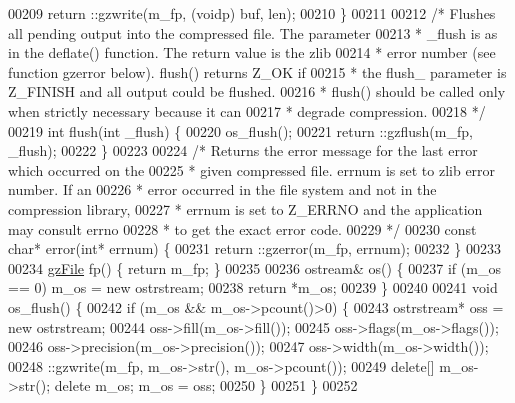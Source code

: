 \begin{DoxyCode}
00209             return ::gzwrite(m\_fp, (voidp) buf, len);
00210         \}
00211 
00212         \textcolor{comment}{/* Flushes all pending output into the compressed file. The parameter}
00213 \textcolor{comment}{         * \_flush is as in the deflate() function. The return value is the zlib}
00214 \textcolor{comment}{         * error number (see function gzerror below). flush() returns Z\_OK if}
00215 \textcolor{comment}{         * the flush\_ parameter is Z\_FINISH and all output could be flushed.}
00216 \textcolor{comment}{         * flush() should be called only when strictly necessary because it can}
00217 \textcolor{comment}{         * degrade compression.}
00218 \textcolor{comment}{         */}
00219         \textcolor{keywordtype}{int} flush(\textcolor{keywordtype}{int} \_flush) \{
00220             os\_flush();
00221             return ::gzflush(m\_fp, \_flush);
00222         \}
00223 
00224         \textcolor{comment}{/* Returns the error message for the last error which occurred on the}
00225 \textcolor{comment}{         * given compressed file. errnum is set to zlib error number. If an}
00226 \textcolor{comment}{         * error occurred in the file system and not in the compression library,}
00227 \textcolor{comment}{         * errnum is set to Z\_ERRNO and the application may consult errno}
00228 \textcolor{comment}{         * to get the exact error code.}
00229 \textcolor{comment}{         */}
00230         \textcolor{keyword}{const} \textcolor{keywordtype}{char}* error(\textcolor{keywordtype}{int}* errnum) \{
00231             return ::gzerror(m\_fp, errnum);
00232         \}
00233 
00234         \hyperlink{structgz_file__s}{gzFile} fp() \{ \textcolor{keywordflow}{return} m\_fp; \}
00235 
00236         ostream& os() \{
00237             \textcolor{keywordflow}{if} (m\_os == 0) m\_os = \textcolor{keyword}{new} ostrstream;
00238             \textcolor{keywordflow}{return} *m\_os;
00239         \}
00240 
00241         \textcolor{keywordtype}{void} os\_flush() \{
00242             \textcolor{keywordflow}{if} (m\_os && m\_os->pcount()>0) \{
00243                 ostrstream* oss = \textcolor{keyword}{new} ostrstream;
00244                 oss->fill(m\_os->fill());
00245                 oss->flags(m\_os->flags());
00246                 oss->precision(m\_os->precision());
00247                 oss->width(m\_os->width());
00248                 ::gzwrite(m\_fp, m\_os->str(), m\_os->pcount());
00249                 \textcolor{keyword}{delete}[] m\_os->str(); \textcolor{keyword}{delete} m\_os; m\_os = oss;
00250             \}
00251         \}
00252 

\end{DoxyCode}
